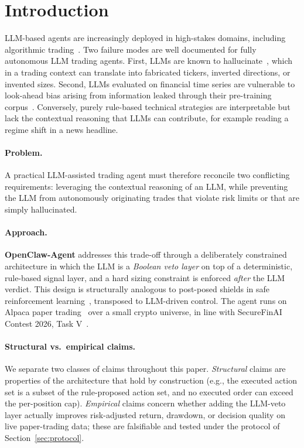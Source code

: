 \documentclass{article}
\begin{document}
\section{Introduction}
LLM-based agents are increasingly deployed in high-stakes domains, including algorithmic trading~\cite{tradingagents_xiao2024,finmem_yu2023,bloomberggpt_wu2023,fingpt_yang2023,lopezlira_tang2023}. Two failure modes are well documented for fully autonomous LLM trading agents. First, LLMs are known to hallucinate~\cite{hallucination_survey_zhang2023}, which in a trading context can translate into fabricated tickers, inverted directions, or invented sizes. Second, LLMs evaluated on financial time series are vulnerable to look-ahead bias arising from information leaked through their pre-training corpus~\cite{lookaheadbench}. Conversely, purely rule-based technical strategies are interpretable but lack the contextual reasoning that LLMs can contribute, for example reading a regime shift in a news headline.

\paragraph{Problem.} A practical LLM-assisted trading agent must therefore reconcile two conflicting requirements: leveraging the contextual reasoning of an LLM, while preventing the LLM from autonomously originating trades that violate risk limits or that are simply hallucinated.

\paragraph{Approach.} \textbf{OpenClaw-Agent} addresses this trade-off through a deliberately constrained architecture in which the LLM is a \emph{Boolean veto layer} on top of a deterministic, rule-based signal layer, and a hard sizing constraint is enforced \emph{after} the LLM verdict. This design is structurally analogous to post-posed shields in safe reinforcement learning~\cite{shielded_rl_alshiekh2018}, transposed to LLM-driven control. The agent runs on Alpaca paper trading~\cite{alpaca_api} over a small crypto universe, in line with SecureFinAI Contest 2026, Task V~\cite{securefinai2026}.

\paragraph{Structural vs.\ empirical claims.} We separate two classes of claims throughout this paper. \emph{Structural} claims are properties of the architecture that hold by construction (e.g., the executed action set is a subset of the rule-proposed action set, and no executed order can exceed the per-position cap). \emph{Empirical} claims concern whether adding the LLM-veto layer actually improves risk-adjusted return, drawdown, or decision quality on live paper-trading data; these are falsifiable and tested under the protocol of Section~\ref{sec:protocol}.
\end{document}
